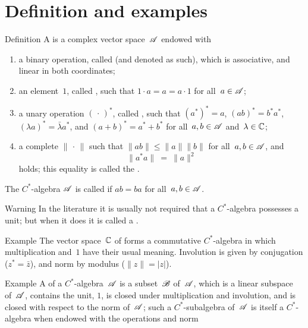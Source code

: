 \documentclass[a]{subfiles}
\begin{document}
\section{Definition and examples}
\begin{parsec}%
\begin{point}{Definition}%
A 
is a complex vector space~$\mathscr{A}$
endowed with
\begin{enumerate}
\item
a binary operation,
called 
(and denoted as such),
which is associative, and linear in both coordinates;
\item
	an element~$1$, called ,
such that $1\cdot a = a = a\cdot 1$
for all~$a\in \mathscr{A}$;
\item
a unary operation $(\,\cdot\,)^*$,
called ,
such that $(a^*)^*=a$,
$(ab)^*=b^*a^*$,
$(\lambda a)^* = \bar\lambda a^*$,
and $(a+b)^* = a^*+b^*$
for all~$a,b\in\mathscr{A}$ and~$\lambda\in \mathbb{C}$;
\item
a complete  $\|\,\cdot\,\|$
such that
$\|ab\|\leq\|a\|\|b\|$
for all~$a,b\in\mathscr{A}$,
and 
\begin{equation*}
\label{eq:Cstar-identity}
\|a^*a\|\ =\ \|a\|^2
\end{equation*}
holds; this equality is called the .
\end{enumerate}
The $C^*$-algebra $\mathscr{A}$ is called 
if $ab=ba$ for all~$a,b\in\mathscr{A}$.
\begin{point}{Warning}%
In the literature it is usually not
required that a $C^*$-algebra
possesses a unit; but when it does it is called
a .
\end{point}
\end{point}
\begin{point}{Example}%
The vector space~$\mathbb{C}$ of 
forms a commutative  $C^*$-algebra
in which
multiplication and~$1$
have their usual meaning.
Involution is given by conjugation ($z^*=\bar{z}$),
and norm by modulus ($\|z\|=|z|$).
\end{point}
\begin{point}{Example}%
A 
of a $C^*$-algebra~$\mathscr{A}$
is a subset~$\mathscr{B}$ of~$\mathscr{A}$,
which is a linear subspace of~$\mathscr{A}$,
contains the unit, $1$, is closed under multiplication
and involution, 
and is closed with respect to the norm of~$\mathscr{A}$;
such a $C^*$-subalgebra of~$\mathscr{A}$
is itself a $C^*$-algebra
when endowed with the operations and norm

\end{point}
\end{parsec}
\end{document}
